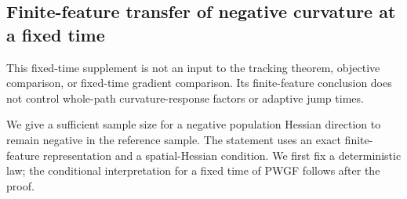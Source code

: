 \subsection{Finite-feature transfer of negative curvature at a fixed time}
\label{subsection:concentration-kappa}

This fixed-time supplement is not an input to the tracking theorem,
objective comparison, or fixed-time gradient comparison.
Its finite-feature conclusion does not control whole-path curvature-response
factors or adaptive jump times.

We give a sufficient sample size for a negative population Hessian
direction to remain negative in the reference sample. The statement
uses an exact finite-feature representation and a spatial-Hessian
condition. We first fix a deterministic law; the conditional
interpretation for a fixed time of PWGF follows after the proof.

